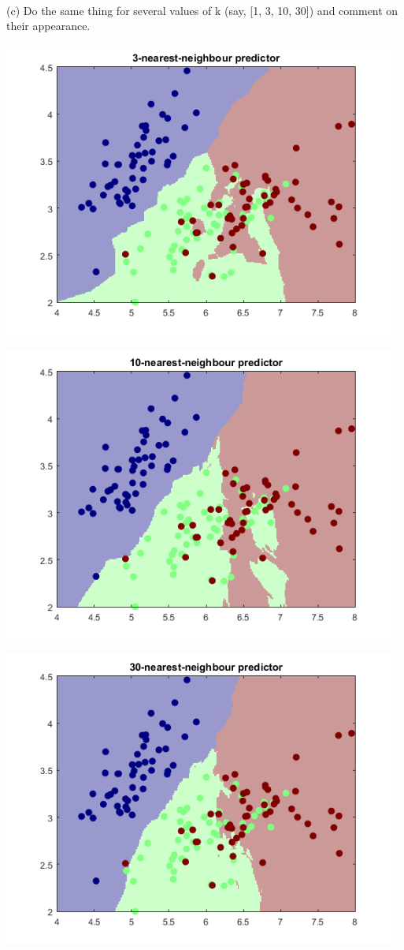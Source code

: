 \documentclass[]{report}   %
\begin{document}
~\\
(c) Do the same thing for several values of k (say, [1, 3, 10, 30]) and comment on their appearance.
\begin{center}
	\includegraphics[width=35em]{2_4_Figure_3.png}
\end{center} 
\begin{center}
	\includegraphics[width=35em]{2_4_Figure_4.png}
\end{center} 
\begin{center}
	\includegraphics[width=35em]{2_4_Figure_5.png}
\end{center} 
\end{document}
